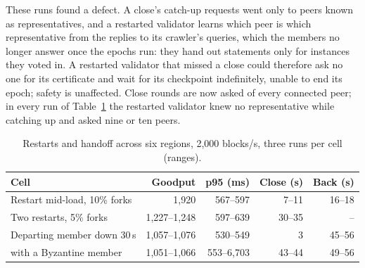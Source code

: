 \documentclass[conference]{IEEEtran}
\begin{document}
These runs found a defect. A close's catch-up requests went only to peers known as representatives, and a restarted validator learns which peer is which representative from the replies to its crawler's queries, which the members no longer answer once the epochs run: they hand out statements only for instances they voted in. A restarted validator that missed a close could therefore ask no one for its certificate and wait for its checkpoint indefinitely, unable to end its epoch; safety is unaffected. Close rounds are now asked of every connected peer; in every run of Table~\ref{tab:restart-wan} the restarted validator knew no representative while catching up and asked nine or ten peers.

\begin{table}[t]
\caption{Restarts and handoff across six regions, 2{,}000 blocks/s, three runs per cell (ranges).}
\label{tab:restart-wan}
\centering
\footnotesize
\begin{tabular}{@{}lrrrr@{}}
\toprule
Cell & Goodput & p95 (ms) & Close (s) & Back (s)\\
\midrule
Restart mid-load, 10\% forks & 1{,}920 & 567--597 & 7--11 & 16--18\\
Two restarts, 5\% forks & 1{,}227--1{,}248 & 597--639 & 30--35 & --\\
Departing member down 30\,s & 1{,}057--1{,}076 & 530--549 & 3 & 45--56\\
\quad with a Byzantine member & 1{,}051--1{,}066 & 553--6{,}703 & 43--44 & 49--56\\
\bottomrule
\end{tabular}
\end{table}
\end{document}
